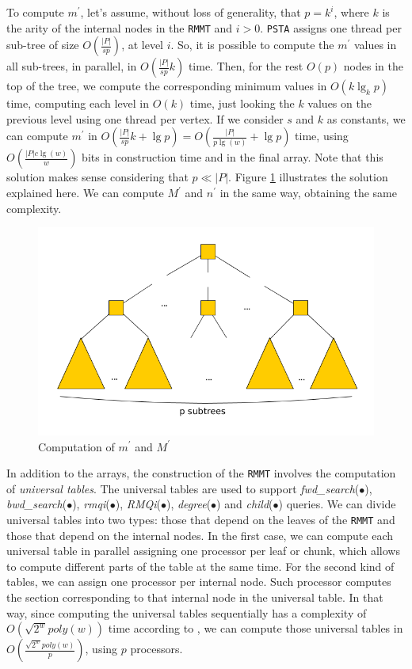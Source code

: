 To compute $m^{\prime}$, let's assume, without loss of generality,
that $p = k^{i}$, where $k$ is the arity
of the internal nodes in the {\tt RMMT} and $i > 0$. {\tt PSTA}
assigns one thread per sub-tree of size $O(\frac{|P|}{sp})$, at level
$i$. So, it is possible to compute the $m^{\prime}$ values in all
sub-trees, in parallel, in $O(\frac{|P|}{sp}k)$ time. Then, for the
rest $O(p)$ nodes in the top of the tree, we compute the corresponding
minimum values in $O(k\lg_{k} p)$ time, computing each level in $O(k)$
time, just looking the $k$ values on the previous level using one
thread per vertex. If we consider $s$ and $k$ as constants, we can compute
$m^{\prime}$ in
$O(\frac{|P|}{sp}k + \lg p) = O(\frac{|P|}{p\lg(w)}+\lg p)$ time,
using $O(\frac{|P|c\lg(w)}{w})$ bits in construction time and in the
final array. Note that this solution makes sense considering that
$p\ll |P|$. Figure \ref{fig:min-max-array} illustrates the solution
explained here. We can compute $M^{\prime}$ and $n^{\prime}$ in the
same way, obtaining the same complexity.

\begin{figure}[ht]
  \centering
  \includegraphics[scale=0.28]{./images/Min-Max-array.png}
  \caption{Computation of $m^{\prime}$ and $M^{\prime}$}
  \label{fig:min-max-array} 
\end{figure}

In addition to the arrays, the construction of the {\tt RMMT} involves
the computation of \emph{universal tables}. The universal tables are
used to support \emph{fwd\_search}($\bullet$),
\emph{bwd\_search}($\bullet$), \emph{rmqi}($\bullet$),
\emph{RMQi}($\bullet$), \emph{degree}($\bullet$) and
\emph{child}($\bullet$) queries. We can divide
universal tables into two types: those that depend on the leaves of
the {\tt RMMT} and those that depend on the internal nodes. In the
first case, we can compute each universal table in parallel assigning
one processor per leaf or chunk, which allows to compute different
parts of the table at the same time. For the second kind of tables, we
can assign one processor per internal node. Such processor computes
the section corresponding to that internal node in the universal
table. In that way, since computing the universal tables sequentially
has a complexity of $O(\sqrt{2^{w}}poly(w))$ time according to
\cite{Navarro:2014:FFS:2620785.2601073}, we can compute those
universal tables in $\displaystyle O(\frac{\sqrt{2^{w}}poly(w)}{p})$,
using $p$ processors.

